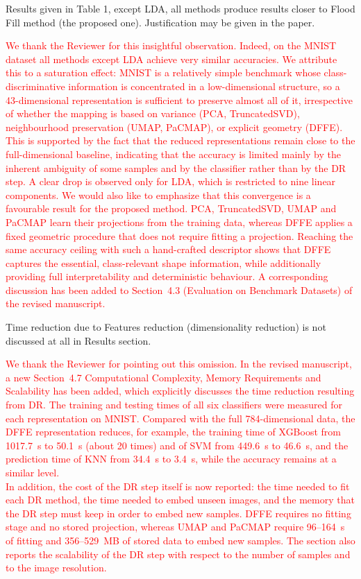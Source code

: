 \documentclass{ar2rc}
\begin{document}
\RC %
Results given in Table 1, except LDA, all methods produce results closer to Flood Fill method (the proposed one). Justification may be given in the paper.

\AR
\textcolor{red}{We thank the Reviewer for this insightful observation. Indeed, on the MNIST dataset all methods except LDA achieve very similar accuracies. We attribute this to a saturation effect: MNIST is a relatively simple benchmark whose class-discriminative information is concentrated in a low-dimensional structure, so a 43-dimensional representation is sufficient to preserve almost all of it, irrespective of whether the mapping is based on variance (PCA, TruncatedSVD), neighbourhood preservation (UMAP, PaCMAP), or explicit geometry (DFFE). This is supported by the fact that the reduced representations remain close to the full-dimensional baseline, indicating that the accuracy is limited mainly by the inherent ambiguity of some samples and by the classifier rather than by the DR step. A clear drop is observed only for LDA, which is restricted to nine linear components.
We would also like to emphasize that this convergence is a favourable result for the proposed method. PCA, TruncatedSVD, UMAP and PaCMAP learn their projections from the training data, whereas DFFE applies a fixed geometric procedure that does not require fitting a projection. Reaching the same accuracy ceiling with such a hand-crafted descriptor shows that DFFE captures the essential, class-relevant shape information, while additionally providing full interpretability and deterministic behaviour. A corresponding discussion has been added to Section~4.3 (Evaluation on Benchmark Datasets) of the revised manuscript.}



\RC %
Time reduction due to Features reduction (dimensionality reduction) is not discussed at all in Results section.

\AR
\textcolor{red}{We thank the Reviewer for pointing out this omission. In the revised manuscript, a new Section~4.7 Computational Complexity, Memory Requirements and Scalability has been added, which explicitly discusses the time reduction resulting from DR. The training and testing times of all six classifiers were measured for each representation on MNIST. Compared with the full 784-dimensional data, the DFFE representation reduces, for example, the training time of XGBoost from 1017.7~s to 50.1~s (about 20 times) and of SVM from 449.6~s to 46.6~s, and the prediction time of KNN from 34.4~s to 3.4~s, while the accuracy remains at a similar level. \\
In addition, the cost of the DR step itself is now reported: the time needed to fit each DR method, the time needed to embed unseen images, and the memory that the DR step must keep in order to embed new samples. DFFE requires no fitting stage and no stored projection, whereas UMAP and PaCMAP require 96--164~s of fitting and 356--529~MB of stored data to embed new samples. The section also reports the scalability of the DR step with respect to the number of samples and to the image resolution.}
\end{document}
